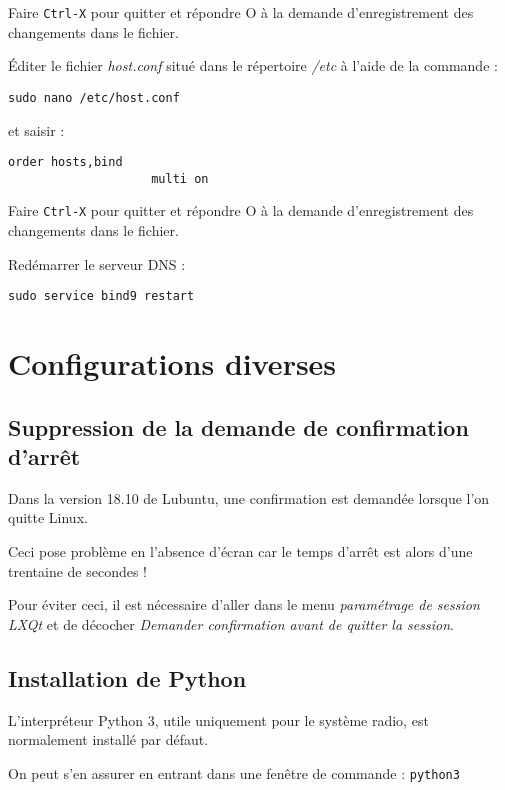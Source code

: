 \documentclass[a4paper]{ffco-rapport}
\begin{document}
		Faire \verb|Ctrl-X| pour quitter et répondre O à la demande d'enregistrement des changements dans le fichier.
	
		Éditer le fichier \emph{host.conf} situé dans le répertoire \emph{/etc} à l'aide de la commande :
		
		\verb|sudo nano /etc/host.conf|
		
		et saisir :

		\lstset{tabsize=2,showspaces=false,showtabs=false,tab=\rightarrowfill}
		\begin{center}
			\ttfamily
			\begin{minipage}{10cm}
				\begin{lstlisting}[basicstyle=\small,language={},gobble=10]
					order hosts,bind
					multi on
				\end{lstlisting}
			\end{minipage}
		\end{center}	
	
		Faire \verb|Ctrl-X| pour quitter et répondre O à la demande d'enregistrement des changements dans le fichier.

		Redémarrer le serveur DNS :
		
		\verb|sudo service bind9 restart|
	
\section{Configurations diverses}
	
	\subsection{Suppression de la demande de confirmation d'arrêt}
		Dans la version 18.10 de Lubuntu, une confirmation est demandée lorsque l'on quitte Linux.
		
		Ceci pose problème en l'absence d'écran car le temps d'arrêt est alors d'une trentaine de secondes !
		
		Pour éviter ceci, il est nécessaire d'aller dans le menu \emph{paramétrage de session LXQt} et de décocher \emph{Demander confirmation avant de quitter la session}.

	\subsection{Installation de Python}
		L'interpréteur Python 3, utile uniquement pour le système radio, est normalement installé par défaut.

		On peut s'en assurer en entrant dans une fenêtre de commande : \verb|python3|
		
\end{document}
